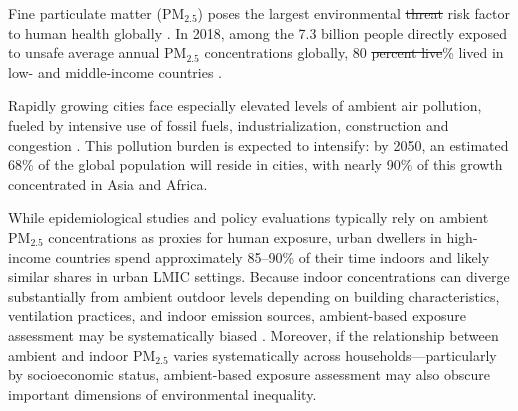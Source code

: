 \documentclass[9pt,twocolumn,twoside]{pnas-new}
\providecommand{\DIFadd}[1]{{\protect\color{red}#1}}
\providecommand{\DIFdel}[1]{{\protect\color{red}\protect\sout{#1}}}
\begin{document}
Fine particulate matter (PM$_{2.5}$) poses the largest environmental \DIFdel{threat} \DIFadd{risk factor} to human health globally \citep{health_effects_institute_state_2024}. 
In 2018, among the 7.3 billion people directly exposed to unsafe average annual PM$_{2.5}$ concentrations globally, 80 \DIFdel{percent live}\DIFadd{\% lived} in low- and middle-income countries \citep{rentschler_global_2023}. 

Rapidly growing cities face especially elevated levels of ambient air pollution, fueled by intensive use of fossil fuels, industrialization, construction and congestion \citep{kim2025tracking, landrigan2018lancet}. This pollution burden is expected to intensify: by 2050, an estimated 68\% of the global population will reside in cities, with nearly 90\% of this growth concentrated in Asia and Africa. 

While epidemiological studies and policy evaluations typically rely on ambient PM$_{2.5}$ concentrations as proxies for human exposure, urban dwellers in high-income countries spend approximately 85–90\% of their time indoors \citep{klepeis_national_2001} and likely similar shares in urban LMIC settings.
Because indoor concentrations can diverge substantially from ambient outdoor levels depending on building characteristics, ventilation practices, and indoor emission sources, ambient-based exposure assessment may be systematically biased \citep{avery_estimating_2010, evangelopoulos_pm25_2020}. Moreover, if the relationship between ambient and indoor PM$_{2.5}$ varies systematically across households—particularly by socioeconomic status, ambient-based exposure assessment may also obscure important dimensions of environmental inequality. 
\end{document}
